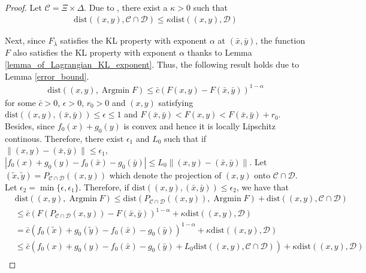 \documentclass{article}
\numberwithin{equation}{section}
\def\Argmin{\mathop{\mathrm{Argmin}}}
\begin{document}
    \begin{proof}
        Let $\mathcal{C} = \Xi \times \Delta$. Due to \cite[Corollary 3]{bauschke1999strong}, there exist a $\kappa>0$ such that
        \begin{align} 
            \mathrm{dist}((x,y),\mathcal{C}\cap \mathcal{D}) \leq \kappa \mathrm{dist}((x,y),\mathcal{D}) 
            \label{corollary_bauschke}
        \end{align}
    
        Next, since $F_{\bar{\lambda}}$ satisfies the KL property with exponent $\alpha$ at $(\bar{x},\bar{y})$, the 
        function $F$ also satisfies the KL property with exponent $\alpha$ thanks to Lemma \ref{lemma_of_Lagrangian_KL_exponent}. Thus, the following
        result holds due to Lemma \ref{error_bound}.
        \begin{align}
            \mathrm{dist} ((x,y),\Argmin F) \leq \bar{c}(F(x,y) - F(\bar{x},\bar{y}))^{1-\alpha} \label{property_of_error_bound}
        \end{align}
        for some $\bar{c} >0$, $\epsilon>0$, $r_0>0$ and $(x,y)$ satisfying $\mathrm{dist}((x,y),(\bar{x},\bar{y})) \leq \epsilon\leq 1$ and 
        $F(\bar{x},\bar{y})<F(x,y)<F(\bar{x},\bar{y}) + r_0$.
        Besides, since $f_0(x)+ g_0(y)$ is convex and hence it is locally Lipschitz continous. 
        Therefore, there exist $\epsilon_1$ and $L_0$ such that if $\|(x,y) - (\bar{x},\bar{y})\rVert \leq \epsilon_1$, 
        $|f_0(x)+g_0(y) - f_0(\bar{x}) -g_0(\bar{y})| \leq L_0\|(x,y) - (\bar{x},\bar{y})\rVert $. 
        Let $(\tilde{x},\tilde{y})= P_{\mathcal{C}\cap \mathcal{D}}((x,y))$ which denote the projection of $(x,y)$ onto $\mathcal{C}\cap \mathcal{D}$.
        Let $\epsilon_2 = \min\{\epsilon, \epsilon_1\}$. Therefore, if $\mathrm{dist}((x,y),(\bar{x},\bar{y}))\leq \epsilon_2$, we have that 
        \begin{align}
            &\mathrm{dist}((x,y), \Argmin F) \leq \mathrm{dist}(P_{\mathcal{C}\cap\mathcal{D}}((x,y)), \Argmin F)
            + \mathrm{dist}((x,y),\mathcal{C}\cap\mathcal{D}) \nonumber \\
            & \overset{\mathop{(a)}}{\leq} \bar{c}(F(P_{\mathcal{C}\cap \mathcal{D}}(x,y)) - F(\bar{x},\bar{y}))^{1-\alpha} + \kappa\mathrm{dist}((x,y),\mathcal{D}) \nonumber \\
            & =\bar{c}(f_0(\tilde{x})+g_0(\tilde{y})-f_0(\bar{x})-g_0(\bar{y}))^{1-\alpha} + \kappa\mathrm{dist}((x,y),\mathcal{D})  \nonumber \\
            & \overset{\mathop{(b)}}{\leq} \bar{c}(f_0(x)+g_0(y)-f_0(\bar{x})-g_0(\bar{y})+L_0\mathrm{dist}((x,y), \mathcal{C}\cap\mathcal{D})) +\kappa \mathrm{dist}((x,y),\mathcal{D}) \nonumber \\

\end{align}
\end{proof}
\end{document}
